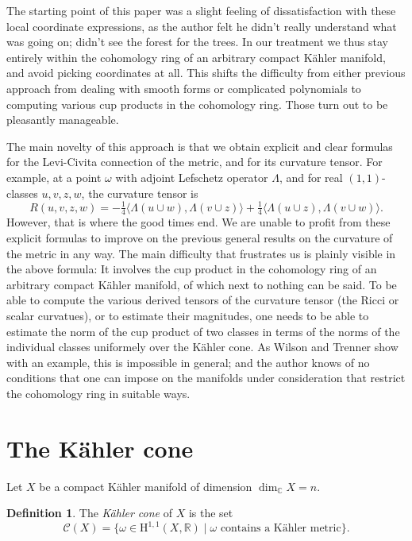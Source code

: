 \documentclass[12pt,a4paper]{amsart}
\theoremstyle{definition}
\newtheorem*{defi}{Definition}
\theoremstyle{remark}
\newcommand{\RR}{\mathbb{R}}
\newcommand{\CC}{\mathbb{C}}
\def\onfo{\tfrac14}
\def\coho#1{\mathrm{H}^{#1}}
\def\kf{\omega}
\def\Lef{\Lambda}
\def\ton{u}
\def\ttw{v}
\def\tth{z}
\def\tfo{w}
\def\KC{C}
\def\RKC{\mathcal{\KC}}
\begin{document}
The starting point of this paper was a slight feeling of dissatisfaction with
these local coordinate expressions, as the author felt he didn't really
understand what was going on; didn't see the forest for the trees. In our
treatment we thus stay entirely within the cohomology ring of an arbitrary
compact K\"{a}hler manifold, and avoid picking coordinates at all. This shifts the
difficulty from either previous approach from dealing with smooth forms or
complicated polynomials to computing various cup products in the cohomology
ring. Those turn out to be pleasantly manageable. 

The main novelty of this approach is that we obtain explicit and clear formulas
for the Levi-Civita connection of the metric, and for its curvature tensor. For
example, at a point $\kf$ with adjoint Lefschetz operator $\Lambda$, and for
real $(1,1)$-classes $\ton, \ttw, \tth, \tfo$, the curvature tensor is
$$
R(\ton,\ttw,\tth,\tfo)
=
- \onfo \langle \Lef(\ton \cup \tfo), \Lef(\ttw \cup \tth) \rangle
+ \onfo \langle \Lef(\ton \cup \tth), \Lef(\ttw \cup \tfo) \rangle.
$$
However, that is where the good times end. We are unable to profit from these
explicit formulas to improve on the previous general results on the curvature of
the metric in any way. The main difficulty that frustrates us is plainly visible
in the above formula: It involves the cup product in the cohomology ring of an
arbitrary compact K\"{a}hler manifold, of which next to nothing can be said. To be
able to compute the various derived tensors of the curvature tensor (the Ricci
or scalar curvatues), or to estimate their magnitudes, one needs to be able to
estimate the norm of the cup product of two classes in terms of the norms of the
individual classes uniformely over the K\"{a}hler cone. As Wilson and Trenner show
with an example, this is impossible in general; and the author knows of no
conditions that one can impose on the manifolds under consideration that
restrict the cohomology ring in suitable ways.



\section{The K\"{a}hler cone}

Let $X$ be a compact K\"{a}hler manifold of dimension $\dim_{\CC} X = n$.

\begin{defi}
The \emph{K\"{a}hler cone} of $X$ is the set
\begin{equation*}
\RKC(X) = \{ \kf \in \coho{1,1}(X,\RR) 
\mid
\text{$\kf$ contains a K\"{a}hler metric}
\}.
\end{equation*}
\end{defi}
\end{document}
